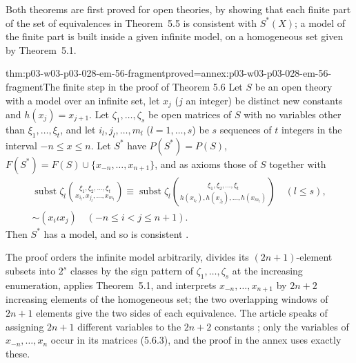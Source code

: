 Both theorems are first proved for open theories, by showing that each
finite part of the set of equivalences in Theorem~5.5 is consistent with
\(S^*(X)\); a model of the finite part is built inside a given infinite
model, on a homogeneous set given by Theorem~5.1.

\begin{hblemma}{thm:p03-w03-p03-028-em-56-fragment}{proved=annex:p03-w03-p03-028-em-56-fragment}{The finite step in the proof of Theorem 5.6}
Let \(S\) be an open theory with a model over an infinite set, let
\(x_j\) (\(j\) an integer) be distinct new constants and \(h(x_j)=x_{j+1}\).
Let \(\zeta_1,\ldots,\zeta_s\) be open matrices of \(S\) with no variables
other than \(\xi_1,\ldots,\xi_t\), and let
\(i_l,j_l,\ldots,m_l\) (\(l=1,\ldots,s\)) be \(s\) sequences of \(t\)
integers in the interval \(-n\leq x\leq n\).  Let \(S^*\) have
\(P(S^*)=P(S)\), \(F(S^*)=F(S)\cup\{x_{-n},\ldots,x_{n+1}\}\), and as axioms
those of \(S\) together with
\cite[(5.6.1)--(5.6.2), p.~61]{EhrenfeuchtMostowski1956}
\begin{gather*}
  \operatorname{subst}\zeta_l\binom{\xi_1,\xi_2,\ldots,\xi_t}{x_{i_l},x_{j_l},\ldots,x_{m_l}}
  \equiv
  \operatorname{subst}\zeta_l\binom{\xi_1,\xi_2,\ldots,\xi_t}{h(x_{i_l}),h(x_{j_l}),\ldots,h(x_{m_l})}
  \quad(l\leq s),\\
  \mathord\sim(x_i\iota x_j)\quad(-n\leq i<j\leq n+1).
\end{gather*}
Then \(S^*\) has a model, and so is consistent
\cite[pp.~61--62]{EhrenfeuchtMostowski1956}.
\end{hblemma}

The proof orders the infinite model arbitrarily, divides its
\((2n+1)\)-element subsets into \(2^s\) classes by the sign pattern of
\(\zeta_1,\ldots,\zeta_s\) at the increasing enumeration, applies
Theorem~5.1, and interprets \(x_{-n},\ldots,x_{n+1}\) by \(2n+2\) increasing
elements of the homogeneous set; the two overlapping windows of \(2n+1\)
elements give the two sides of each equivalence.  The article speaks of
assigning \(2n+1\) different variables to the \(2n+2\) constants
\cite[p.~61]{EhrenfeuchtMostowski1956}; only the variables of
\(x_{-n},\ldots,x_n\) occur in its matrices (5.6.3), and the proof in the
annex uses exactly these.

